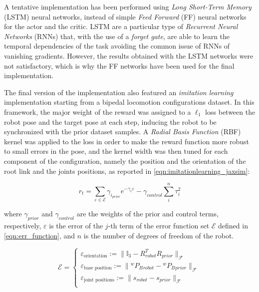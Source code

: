 A tentative implementation has been performed using \textit{Long Short-Term Memory} (LSTM) neural networks, instead of simple \textit{Feed Forward} (FF) neural networks for the actor and the critic. \ac{LSTM} are a particular type of \textit{Recurrent Neural Networks} (RNNs) that, with the use of a \textit{forget gate}, are able to learn the temporal dependencies of the task avoiding the common issue of \ac{RNN}s of vanishing gradients. However, the results obtained with the \ac{LSTM} networks were not satisfactory, which is why the \ac{FF} networks have been used for the final implementation.

The final version of the implementation also featured an \textit{imitation learning} implementation starting from a bipedal locomotion configurations dataset. In this framework, the major weight of the reward was assigned to a $\ell_1$ loss between the robot pose and the target pose at each step, inducing the robot to be synchronized with the prior dataset samples. A \textit{Radial Basis Function} (\ac{RBF}) kernel was applied to the loss in order to make the reward function more robust to small errors in the pose, and the kernel width was then tuned for each component of the configuration, namely the position and the orientation of the root link and the joints positions, as reported in \cref{eqn:imitationlearning_jaxsim}:

\begin{equation}
    \label{eqn:imitationlearning_jaxsim}
    r _t = \sum _{\varepsilon \in \mathcal{E}} \gamma _{i _{prior}} e ^{-\gamma _{\epsilon} \varepsilon} - \gamma _{control} \sum _i ^{n} \tau _i ^2
\end{equation}

where $\gamma _{prior}$ and $\gamma _{control}$ are the weights of the prior and control terms, respectively, $\varepsilon$ is the error of the $j$-th term of the error function set $\mathcal{E}$ defined in \cref{eqn:err_function}, and $n$ is the number of degrees of freedom of the robot.

\begin{equation}[right=\empheqrbrace{}]
    \label{eqn:err_function}
    \mathcal{E} =
    \begin{cases}
        \varepsilon _{\text{orientation}}    := \lVert \mathbb{I}_3 - R_{robot}^T R_{prior}  \rVert _{\mathcal{F}}        \\
        \varepsilon _{\text{base position}}  := \lVert {}^wP _B {} _{robot} - {}^w P _B {}_{prior}  \rVert _{\mathcal{F}} \\
        \varepsilon _{\text{joint positions}}:= \lVert s _{robot} - s _{prior}  \rVert _{\mathcal{F}}                     \\
    \end{cases}
\end{equation}

